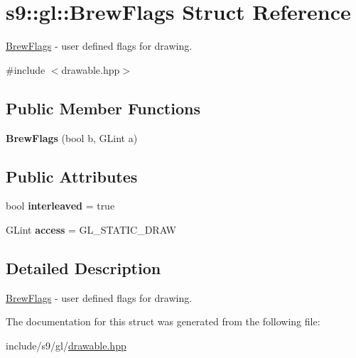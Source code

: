 \hypertarget{structs9_1_1gl_1_1BrewFlags}{\section{s9\-:\-:gl\-:\-:Brew\-Flags Struct Reference}
\label{structs9_1_1gl_1_1BrewFlags}
}


\hyperlink{structs9_1_1gl_1_1BrewFlags}{Brew\-Flags} -\/ user defined flags for drawing.  




{\ttfamily \#include $<$drawable.\-hpp$>$}

\subsection*{Public Member Functions}
\begin{DoxyCompactItemize}
\item 
\hypertarget{structs9_1_1gl_1_1BrewFlags_a8f20f1596ca40dad59a6d5ea9cb0e355}{{\bfseries Brew\-Flags} (bool b, G\-Lint a)}\label{structs9_1_1gl_1_1BrewFlags_a8f20f1596ca40dad59a6d5ea9cb0e355}

\end{DoxyCompactItemize}
\subsection*{Public Attributes}
\begin{DoxyCompactItemize}
\item 
\hypertarget{structs9_1_1gl_1_1BrewFlags_a1fa68bb0fd7f35028a713ab0e2d0ba12}{bool {\bfseries interleaved} = true}\label{structs9_1_1gl_1_1BrewFlags_a1fa68bb0fd7f35028a713ab0e2d0ba12}

\item 
\hypertarget{structs9_1_1gl_1_1BrewFlags_a630a185fcd8038fb6c3b3669fb2e169b}{G\-Lint {\bfseries access} = G\-L\-\_\-\-S\-T\-A\-T\-I\-C\-\_\-\-D\-R\-A\-W}\label{structs9_1_1gl_1_1BrewFlags_a630a185fcd8038fb6c3b3669fb2e169b}

\end{DoxyCompactItemize}


\subsection{Detailed Description}
\hyperlink{structs9_1_1gl_1_1BrewFlags}{Brew\-Flags} -\/ user defined flags for drawing. 

The documentation for this struct was generated from the following file\-:\begin{DoxyCompactItemize}
\item 
include/s9/gl/\hyperlink{drawable_8hpp}{drawable.\-hpp}\end{DoxyCompactItemize}
